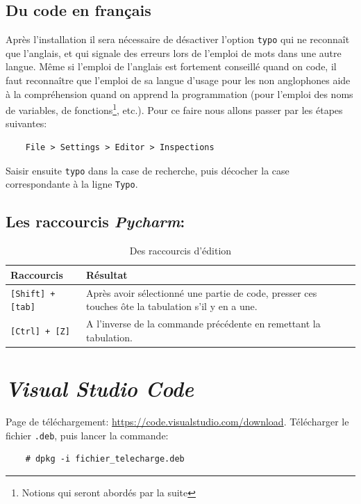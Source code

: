 \documentclass[a4paper,11pt]{book}
\begin{document}
\subsection*{Du code en français}
Après l'installation il sera nécessaire de désactiver l'option \texttt{typo} qui ne reconnaît que l'anglais, et qui signale des erreurs lors de l'emploi de mots dans une autre langue. Même si l'emploi de l'anglais est fortement conseillé quand on code, il faut reconnaître que l'emploi de sa langue d'usage pour les non anglophones aide à la compréhension quand on apprend la programmation (pour l'emploi des noms de variables, de fonctions\footnote{Notions qui seront abordés par la suite}, etc.). Pour ce faire nous allons passer par les étapes suivantes:
\begin{verbatim}
    File > Settings > Editor > Inspections
\end{verbatim}
Saisir ensuite \texttt{typo} dans la case de recherche, puis décocher la case correspondante à la ligne \texttt{Typo}.
\medskip

\subsection*{Les raccourcis \textit{Pycharm}:}
\begin{table}[h]
\begin{center}
\begin{tabular}{|p{4cm}|p{10cm}|}
\hline
\textbf{Raccourcis} & \textbf{Résultat} \\
\hline
\texttt{[Shift] + [tab]} & Après avoir sélectionné une partie de code, presser ces touches ôte la tabulation s'il y en a une. \\
\hline
\texttt{[Ctrl] + [Z]} & A l'inverse de la commande précédente en remettant la tabulation. \\
\hline
\end{tabular}
\caption{Des raccourcis d'édition}
\end{center}

\end{table}
\section{\textit{Visual Studio Code}}
Page de téléchargement: \url{https://code.visualstudio.com/download}. Télécharger le fichier \texttt{.deb}, puis lancer la commande:
\begin{verbatim}
    # dpkg -i fichier_telecharge.deb
\end{verbatim}
\medskip
\end{document}
